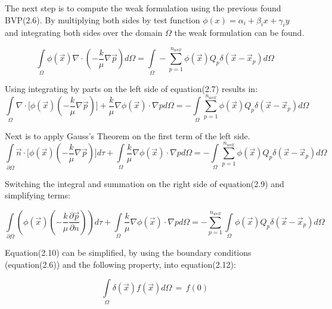 \documentclass[a4paper]{report}
\begin{document}
\bigskip

The next step is to compute the weak formulation using the previous found BVP(2.6). By multiplying both sides by test function $\phi(x) = \alpha_i + \beta_i x + \gamma_i y$ and integrating both sides over the domain $\Omega$ the weak formulation can be found.

\begin{equation}
	\int\limits_{\Omega}\phi(\vec{x})\nabla\cdot( -\frac{k}{\mu}\nabla\vec{p}) d\Omega =\int\limits_{\Omega}-\sum_{p=1}^{n_{well}}\phi(\vec{x})  Q_p\delta(\vec{x}-\vec{x}_p)d\Omega
\end{equation}

Using integrating by parts on the left side of equation(2.7) results in:
\begin{equation}
	\int\limits_{\Omega}\nabla\cdot \big[\phi(\vec{x})(-\frac{k}{\mu}\nabla\vec{p})] +\frac{k}{\mu}\nabla\phi(\vec{x})\cdot\nabla p d\Omega= -\int\limits_{\Omega}\sum_{p=1}^{n_{well}}\phi(\vec{x}) Q_p\delta(\vec{x}-\vec{x}_p)d\Omega
\end{equation}

Next is to apply Gauss's Theorem on the first term of the left side.
\begin{equation}
	\int\limits_{\partial\Omega}\vec{n}\cdot\big[\phi(\vec{x})(-\frac{k}{\mu}\nabla\vec{p})\big]d\tau+\int\limits_{\Omega}\frac{k}{\mu}\nabla\phi(\vec{x})\cdot\nabla p d\Omega= -\int\limits_{\Omega}\sum_{p=1}^{n_{well}}\phi(\vec{x}) Q_p\delta(\vec{x}-\vec{x}_p)d\Omega
\end{equation}


Switching the integral and summation on the right side of equation(2.9) and simplifying terms:

\begin{equation}
	\int\limits_{\partial\Omega}(\phi(\vec{x})(-\frac{k}{\mu}\frac{\partial\vec{p}}{\partial n}))d\tau+\int\limits_{\Omega}\frac{k}{\mu}\nabla\phi(\vec{x})\cdot\nabla p d\Omega= -\sum_{p=1}^{n_{well}}\int\limits_{\Omega}\phi(\vec{x}) Q_p\delta(\vec{x}-\vec{x}_p)d\Omega
\end{equation}


Equation(2.10) can be simplified, by using the boundary conditions (equation(2.6)) and the following property, into equation(2.12): 

\begin{equation}
	\int\limits_{\Omega}\delta(\vec{x})f(\vec{x})d\Omega \, = \, f(0)	
\end{equation}
\end{document}
